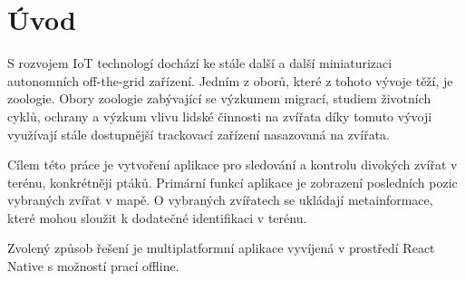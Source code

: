 \chapter*{Úvod}

S rozvojem IoT technologí dochází ke stále další a další miniaturizaci autonomních off-the-grid zařízení. Jedním z oborů, které z tohoto vývoje těží, je zoologie. Obory zoologie zabývající se výzkumem migrací, studiem životních cyklů, ochrany a výzkum vlivu lidské činnosti na zvířata díky tomuto vývoji využívají stále dostupnější trackovací zařízení nasazovaná na zvířata.


Cílem této práce je vytvoření aplikace pro sledování a kontrolu divokých zvířat v terénu, konkrétněji ptáků. Primární funkcí aplikace je zobrazení posledních pozic vybraných zvířat v mapě. O vybraných zvířatech se ukládají metainformace, které mohou sloužit k dodatečné identifikaci v terénu.

Zvolený způsob řešení je multiplatformní aplikace vyvíjená v prostředí React Native s možností prací offline. 





